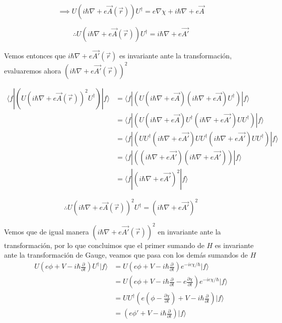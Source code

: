 \documentclass[12pt]{article}
\begin{document}
\begin{equation}
\implies U(i\hbar\nabla+e\vec{A}(\vec{r}))U^{\dag}=e\nabla\chi + i\hbar\nabla  + e\vec{A}
\end{equation}

\begin{equation}
\therefore \boxed{U(i\hbar\nabla+e\vec{A}(\vec{r}))U^{\dag}=i\hbar\nabla  + e\vec{A'}}
\end{equation}

Vemos entonces que $i\hbar\nabla+e\vec{A'}(\vec{r})$ es invariante ante la transformación, evaluaremos ahora $(i\hbar\nabla+e\vec{A'}(\vec{r}))^2$


\begin{equation}
\begin{split}
\langle f|(U(i\hbar\nabla+e\vec{A}(\vec{r}))^{2}U^{\dag})|f\rangle &=\langle f|(U(i\hbar\nabla+e\vec{A})(i\hbar\nabla+e\vec{A})U^{\dag})|f\rangle \\ 
&=\langle f|(U(i\hbar\nabla+e\vec{A})U^{\dag}(i\hbar\nabla+e\vec{A'})UU^{\dag})|f\rangle \\ 
&=\langle f|(UU^{\dag}(i\hbar\nabla+e\vec{A'})UU^{\dag}(i\hbar\nabla+e\vec{A'})UU^{\dag})|f\rangle \\ 
&=\langle f|((i\hbar\nabla+e\vec{A'})(i\hbar\nabla+e\vec{A'}))|f\rangle \\ 
&=\langle f|(i\hbar\nabla+e\vec{A'})^2|f\rangle
\end{split}
\end{equation}

\begin{equation}
\therefore  \boxed{U(i\hbar\nabla+e\vec{A}(\vec{r}))^{2}U^{\dag}=(i\hbar\nabla+e\vec{A'})^2}
\end{equation}

Vemos que de igual manera $(i\hbar\nabla+e\vec{A'}(\vec{r}))^2$ en invariante ante la transformación, por lo que concluimos que el primer sumando de $H$ es invariante ante la transformación de Gauge, veamos que pasa con los demás sumandos de $H$
\begin{equation}
\begin{split}
U(e\phi+V-i\hbar\frac{\partial}{\partial t})U^{\dag}|f\rangle &=U(e\phi+V-i\hbar\frac{\partial}{\partial t})e^{-ie\chi/\hbar}|f\rangle\\
&=U(e\phi+V-i\hbar\frac{\partial}{\partial t}-e\frac{\partial\chi }{\partial t})e^{-ie\chi/\hbar}|f\rangle\\
&=UU^{\dag}(e(\phi-\frac{\partial\chi}{\partial t})+V-i\hbar\frac{\partial}{\partial t})|f\rangle\\
&=(e\phi'+V-i\hbar\frac{\partial}{\partial t})|f\rangle
\end{split}
\end{equation}
\end{document}
